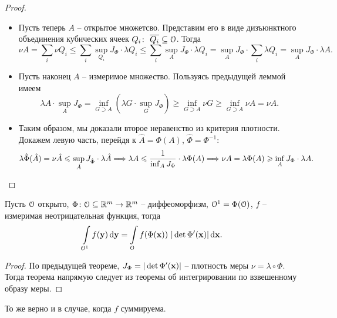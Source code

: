 {\begin{proof}
\begin{itemize}
\[            .\]
        \item Пусть теперь $A$ -- открытое множетсво. Представим его в виде дизъюнктного объединения
            кубических ячеек $Q_i \colon~ \overline{Q_i} \subseteq \mathcal{O}$. Тогда
            \[
                \nu{A} = \sum_i{\nu{Q_i}} \leqslant \sum_i{\sup_{Q_i}{J_\Phi} \cdot \lambda{Q_i}} \leqslant
                \sum_i{\sup_A{J_\Phi} \cdot \lambda{Q_i}} = \sup_A{J_\Phi} \cdot \sum_i{\lambda{Q_i}} =
                \sup_A{J_\Phi} \cdot \lambda{A}
            .\]
        \item Пусть наконец $A$ -- измеримое множество. Пользуясь предыдущей леммой имеем
            \[
                \lambda{A} \cdot \sup_A{J_\Phi} = \inf_{G \supset A}{\left(\lambda{G} \cdot \sup_G{J_\Phi}\right)}
                \geqslant \inf_{G \supset A}{\nu{G}} \geqslant \inf_{G \supset A}{\nu{A}} = \nu{A}
            .\]
        \item Таким образом, мы доказали второе неравенство из критерия плотности. Докажем левую часть,
            перейдя к $\hat{A} = \Phi(A)$, $\hat{\Phi} = \Phi^{-1}$:
            \[
                \lambda{\hat{\Phi}(\hat{A})} = \nu{\hat{A}} \leqslant 
                \sup_{\hat{A}}{J_{\hat{\Phi}}} \cdot \lambda{\hat{A}} \Longrightarrow
                \lambda{A} \leqslant \frac{1}{\inf_{A}{J_\Phi}} \cdot \lambda{\Phi(A)} \Longrightarrow
                \nu{A} = \lambda{\Phi(A)} \geqslant \inf_{A}{J_\Phi} \cdot \lambda{A}
            .\]
    \end{itemize}
\end{proof}

\begin{theorem}
    Пусть $\mathcal{O}$ открыто, $\Phi \colon \mathcal{O} \subseteq \mathbb{R}^m \to \mathbb{R}^m$ -- диффеоморфизм,
    $\mathcal{O}^1 = \Phi(\mathcal{O})$, $f$ -- измеримая неотрицательная функция, тогда
    \[
        \int\limits_{\mathcal{O}^1}{f(\mathbf{y}) \,\mathrm{d} \mathbf{y}} = \int\limits_{\mathcal{O}}{f(\Phi(\mathbf{x}))~ |\det{\Phi'(\mathbf{x})}| \,\mathrm{d} \mathbf{x}}
    .\] 
\end{theorem}
\begin{proof}
    По предыдущей теореме, $J_\Phi = |\det{\Phi'(\mathbf{x})}|$ -- плотность меры $\nu = \lambda \circ \Phi$.
    Тогда теорема напрямую следует из теоремы об интегрировании по взвешенному образу меры.
\end{proof}

\begin{remark}
    То же верно и в случае, когда $f$ суммируема.
\end{remark}

}
